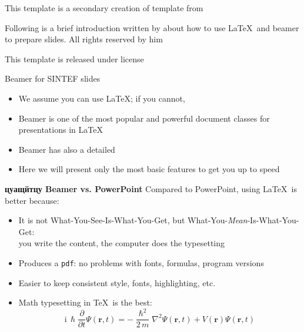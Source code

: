 \begin{frame}

This template is a secondary creation of  template from  \vspace{\baselineskip}

Following is a brief introduction written by  about how to use \LaTeX\ and beamer to prepare slides. All rights reserved by him\vspace{\baselineskip}

This template is released under  license

\end{frame}


\begin{frame}{Beamer for SINTEF slides}{\thesection \, \secname}

\begin{itemize}
\item We assume you can use \LaTeX; if you cannot,
\item Beamer is one of the most popular and powerful document
classes for presentations in \LaTeX
\item Beamer has also a detailed
\item Here we will present only the most basic features to get you up to speed
\end{itemize}
\end{frame}

\begin{frame}{\textbf{цуащйтцу Beamer vs. PowerPoint}}
Compared to PowerPoint, using \LaTeX\ is better because:
\begin{itemize}
\item It is not What-You-See-Is-What-You-Get, but
What-You-\emph{Mean}-Is-What-You-Get:\\
you write the content, the computer does the typesetting
\item Produces a \texttt{pdf}: no problems with fonts, formulas,
      program versions
\item Easier to keep consistent style, fonts, highlighting, etc.
\item Math typesetting in \TeX\ is the best:
\begin{equation*}
\mathrm{i}\,\hslash\frac{\partial}{\partial t} \Psi(\mathbf{r},t) =
-\frac{\hslash^2}{2\,m}\nabla^2\Psi(\mathbf{r},t)
+ V(\mathbf{r})\Psi(\mathbf{r},t)
\end{equation*}

\end{itemize}
\end{frame}

